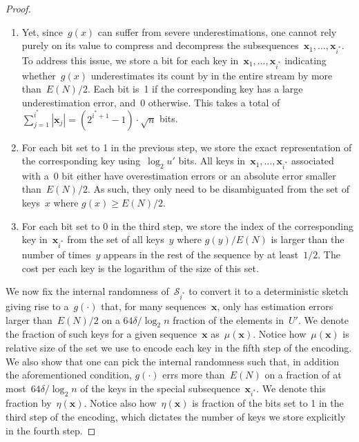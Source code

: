 \documentclass[sigconf]{acmart}
\begin{document}
\begin{proof}
\begin{enumerate}[label=(\roman*)]
            most probably does not appear
            in~$\mathbf{x}_1,\dots,\mathbf{x}_{i^*}$. This allows for reducing
            the number of bits required to encode each element
            in~$\mathbf{x}_1,\dots,\mathbf{x}_{i^*}$ in our compression scheme.
        \item Yet, since~$g(x)$ can suffer from severe underestimations, one
            cannot rely purely on its value to compress and decompress the
            subsequences~$\mathbf{x}_1,\dots,\mathbf{x}_{i^*}$. To address this
            issue, we store a bit for each key
            in~$\mathbf{x}_1,\dots,\mathbf{x}_{i^*}$ indicating whether~$g(x)$
            underestimates its count by in the entire stream by more
            than~$E(N)/2$. Each bit is~1 if the corresponding key has a large
            underestimation error, and~0 otherwise. This takes a total
            of~$\sum_{j=1}^{i^*} |\mathbf{x}_j|=(2^{i^*+1}-1) \cdot \sqrt{n}$
            bits.
        \item For each bit set to 1 in the previous step, we store the exact
            representation of the corresponding key using~$\log_2 u'$ bits. All
            keys in~$\mathbf{x}_1,\dots,\mathbf{x}_{i^*}$ associated with a~0
            bit either have overestimation errors or an absolute error smaller
            than~$E(N)/2$. As such, they only need to be disambiguated from the
            set of keys~$x$ where $g(x) \geq E(N)/2$.
        \item For each bit set to 0 in the third step, we store the index of
            the corresponding key in~$\mathbf{x}_{i^*}$ from the set of all
            keys~$y$ where $g(y)/E(N)$ is larger than the number of times~$y$
            appears in the rest of the sequence by at least~$1/2$. The cost per
            each key is the logarithm of the size of this set.
    \end{enumerate}

    We now fix the internal randomness of~$\mathcal{S}_{i^*}$ to convert it to
    a deterministic sketch giving rise to a~$g(\cdot)$ that, for many
    sequences~$\mathbf{x}$, only has estimation errors larger than~$E(N)/2$ on
    a $64\delta/\log_2 n$ fraction of the elements in~$U'$. We denote the
    fraction of such keys for a given sequence~$\mathbf{x}$
    as~$\mu(\mathbf{x})$. Notice how~$\mu(\mathbf{x})$ is relative size of the
    set we use to encode each key in the fifth step of the encoding. We also
    show that one can pick the internal randomness such that, in addition the
    aforementioned condition, $g(\cdot)$ errs more than~$E(N)$ on a fraction of
    at most~$64\delta/\log_2 n$ of the keys in the special
    subsequence~$\mathbf{x}_{i^*}$. We denote this fraction
    by~$\eta(\mathbf{x})$. Notice also how~$\eta(\mathbf{x})$ is fraction of
    the bits set to 1 in the third step of the encoding, which dictates the
    number of keys we store explicitly in the fourth step. 


\end{proof}
\end{document}
